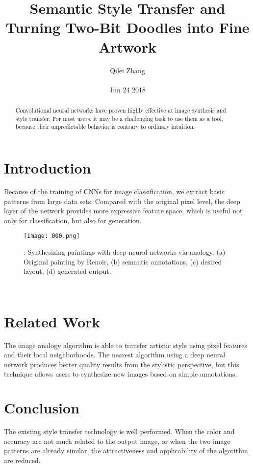 \documentclass[30pt,twocolumn,letterpaper]{article}
\author{Qilei Zhang\\\\
Jun 24 2018}
\title{Semantic Style Transfer and Turning Two-Bit Doodles into Fine Artwork}
\begin{document}
\maketitle
\begin{abstract}
  Convolutional neural networks have proven highly effective at image synthesis and style transfer. For most users, it may be a challenging task to use them as a tool, because their unpredictable behavior is contrary to ordinary intuition.
\end{abstract}
\section{Introduction}
Because of the training of CNNs for image classification, we extract basic patterns from large data sets. Compared with the original pixel level, the deep layer of the network provides more expressive feature space, which is useful not only for classification, but also for generation\cite{Beebee2010Transfer}. \\
\begin{figure}[htbp]
\small
\centering
\texttt{[image: 000.png]}
\caption{: Synthesizing paintings with deep neural networks
via analogy. (a) Original painting by Renoir, (b) semantic
annotations, (c) desired layout, (d) generated output.}
\label{fig:lable}
\end{figure}\\
\section{Related Work}
The image analogy algorithm is able to transfer artistic style using pixel features and their local neighborhoods\cite{Diester2010Numerical}. The nearest algorithm using a deep neural network produces better quality results from the stylistic perspective, but this technique allows users to synthesize new images based on simple annotations\cite{Robert2012Focus}.\\
\section{Conclusion}
The existing style transfer technology is well performed. When the color and accuracy are not much related to the output image, or when the two image patterns are already similar, the attractiveness and applicability of the algorithm are reduced\cite{Thomas1969Paired}.
{\small


}
\end{document}
